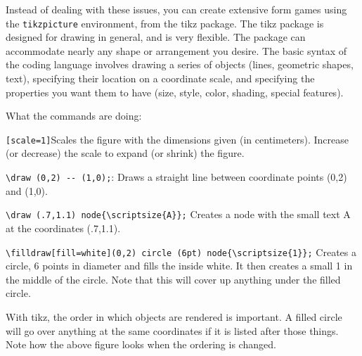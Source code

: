 \documentclass[12pt]{article}
\begin{document}

Instead of dealing with these issues, you can create extensive form games using the \verb+tikzpicture+ environment, from the tikz package. The tikz package is designed for drawing in general, and is very flexible. The package can accommodate nearly any shape or arrangement you desire. The basic syntax of the coding language involves drawing a series of objects (lines, geometric shapes, text), specifying their location on a coordinate scale, and specifying the properties you want them to have (size, style, color, shading, special features). 


\begin{center}
\end{center}

What the commands are doing: \\

\begin{compactitem}
\item \verb+[scale=1]+Scales the figure with the dimensions given (in centimeters).  Increase (or decrease) the scale to expand (or shrink) the figure.
\item \verb+\draw (0,2) -- (1,0);+: Draws a straight line between coordinate points (0,2) and (1,0).
\item \verb+\draw (.7,1.1) node{\scriptsize{A}};+ Creates a node with the small text A at the coordinates (.7,1.1).
\item \verb+\filldraw[fill=white](0,2) circle (6pt) node{\scriptsize{1}};+ Creates a circle, 6 points in diameter and fills the inside white. It then creates a small 1 in the middle of the circle. Note that this will cover up anything under the filled circle. 
\end{compactitem}
\vspace{.5cm}
With tikz, the order in which objects are rendered is important. A filled circle will go over anything at the same coordinates if it is listed after those things. Note how the above figure looks when the ordering is changed.
\end{document}

